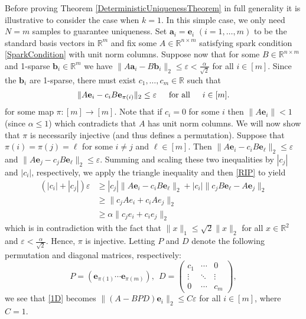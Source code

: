 \documentclass[journal, onecolumn]{IEEEtran}
\begin{document}
Before proving Theorem \ref{DeterministicUniquenessTheorem} in full generality it is illustrative to consider the case when $k=1$. In this simple case, we only need $N = m$ samples to guarantee uniqueness. Set $\mathbf{a}_i = \mathbf{e}_i$ $(i = 1, \ldots, m)$ to be the standard basis vectors in $\mathbb{R}^m$ and fix some $A \in \mathbb{R}^{n \times m}$ satisfying spark condition \eqref{SparkCondition} with unit norm columns. Suppose now that for some $B \in \mathbb{R}^{n \times m}$ and 1-sparse $\mathbf{b}_i \in \mathbb{R}^m$ we have  $\|A\mathbf{a}_i - B\mathbf{b}_i\|_2 \leq \varepsilon < \frac{\alpha}{\sqrt{2}}$ for all $i \in [m]$. Since the $\mathbf{b}_i$ are 1-sparse, there must exist $c_1, \ldots, c_m \in \mathbb{R}$ such that 
\begin{align}\label{1D}
\|A\mathbf{e}_i - c_iB\mathbf{e}_{\pi(i)}\|_2 \leq \varepsilon \indent \text{for all} \indent i \in [m].
\end{align}
for some map $\pi: [m] \to [m]$. 
Note that if $c_i = 0$ for some $i$ then $\|A\mathbf{e}_i\| < 1$ (since $\alpha \leq 1$) which contradicts that $A$ has unit norm columns. We will now show that $\pi$ is necessarily injective (and thus defines a permutation). Suppose that $\pi(i) = \pi(j) = \ell$ for some $i \neq j$ and $\ell \in [m]$. Then $\|A\mathbf{e}_i - c_iB\mathbf{e}_{\ell}\|_2  \leq \varepsilon$ and $\|A\mathbf{e}_j - c_jB\mathbf{e}_{\ell}\|_2 \leq \varepsilon$. Summing and scaling these two inequalities by $|c_j|$ and $|c_i|$, respectively, we apply the triangle inequality and then \eqref{RIP} to yield
\begin{align*}
(|c_i| + |c_j|) \varepsilon
&\geq |c_j|\|A\mathbf{e}_i - c_iB\mathbf{e}_{\ell}\|_2 + |c_i|\|c_jB\mathbf{e}_{\ell} - A\mathbf{e}_j\|_2 \\
&\geq \|c_jAe_i + c_iAe_j\|_2 \\
&\geq \alpha\|c_je_i + c_ie_j\|_2
\end{align*}
%
which is in contradiction with the fact that $\|x\|_1 \leq \sqrt{2}\|x\|_2$ for all $x \in \mathbb{R}^2$ and $\varepsilon < \frac{\alpha}{\sqrt{2}}$. Hence, $\pi$ is injective. Letting $P$ and $D$ denote the following permutation and diagonal matrices, respectively:
\begin{equation}\label{PandD}
P = \left( \mathbf{e}_{\pi(1)} \cdots \mathbf{e}_{\pi(m)}\right), \ \ D = \left(\begin{array}{ccc}c_1 & \cdots & 0 \\\vdots & \ddots & \vdots \\0 & \cdots & c_m\end{array}\right),
\end{equation}
%
we see that \eqref{1D} becomes $\|(A - BPD)\mathbf{e}_i\|_2 \leq C\varepsilon$ for all $i \in [m]$, where $C = 1$. 
\end{document}
